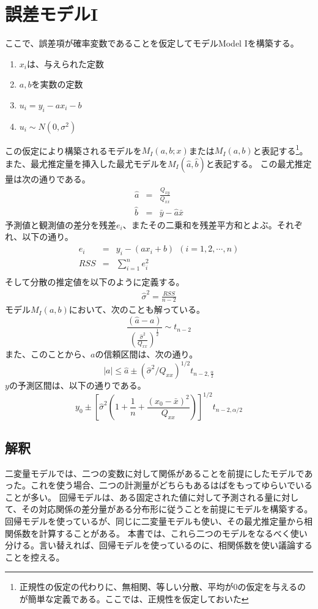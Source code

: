 \section{誤差モデルI}
ここで、誤差項が確率変数であることを仮定してモデルModel Iを構築する。
\begin{enumerate}
 \item $x_i$は、与えられた定数
 \item $a,b$を実数の定数
 \item $u_i = y_i-a x_i -b$
 \item $u_i \sim N(0,\sigma^2)$
\end{enumerate}
この仮定により構築されるモデルを$M_{I}(a,b; x)$または$M_I(a,b)$と表記する\footnote{正規性の仮定の代わりに、無相関、等しい分散、平均が$0$の仮定を与えるのが簡単な定義である。ここでは、正規性を仮定しておいた}。
また、最尤推定量を挿入した最尤モデルを$M_I(\hat{a},\hat{b})$と表記する。
この最尤推定量は次の通りである。
\begin{eqnarray*}
 \hat{a} &=& \frac{Q_{xy}}{Q_{xx}}\\
 \hat{b} &=& \bar{y}-\hat{a}\bar{x}
\end{eqnarray*}
予測値と観測値の差分を残差$e_i$、またその二乗和を残差平方和とよぶ。それぞれ、以下の通り。
\begin{eqnarray*}
 e_i &=& y_i - (ax_i+b)\ \ (i=1,2,\cdots,n)\\
 RSS &=& \sum_{i=1}^n e_i^2 \\
\end{eqnarray*}
そして分散の推定値を以下のように定義する。
\begin{eqnarray*}
 \hat{\sigma}^2 = \frac{RSS}{n-2}
\end{eqnarray*}
モデル$M_I(a,b)$において、次のことも解っている。
\begin{equation*}
 \frac{(\hat{a}-a)}{ \left( \frac{\hat{\sigma}^2}{Q_{xx}} \right)^\frac{1}{2}} \sim t_{n-2}
\end{equation*}
また、このことから、$a$の信頼区間は、次の通り。
\begin{equation*}
 |a| \leq \hat{a}\pm(\hat{\sigma}^2/Q_{xx})^{1/2}t_{n-2,\frac{\alpha}{2}}
\end{equation*}
$y$の予測区間は、以下の通りである。
\begin{equation*}
 y_0\pm\left[\hat{\sigma}^2\left( 1+\frac{1}{n} +\frac{(x_0-\bar{x})^2}{Q_{xx}} \right)\right]^{1/2}t_{n-2,\alpha/2}
\end{equation*}

\subsection{解釈}
二変量モデルでは、二つの変数に対して関係があることを前提にしたモデルであった。これを使う場合、二つの計測量がどちらもあるはばをもってゆらいでいることが多い。
回帰モデルは、ある固定された値に対して予測される量に対して、その対応関係の差分量がある分布形に従うことを前提にモデルを構築する。
回帰モデルを使っているが、同じに二変量モデルも使い、その最尤推定量から相関係数を計算することがある。
本書では、これら二つのモデルをなるべく使い分ける。言い替えれば、回帰モデルを使っているのに、相関係数を使い議論することを控える。


